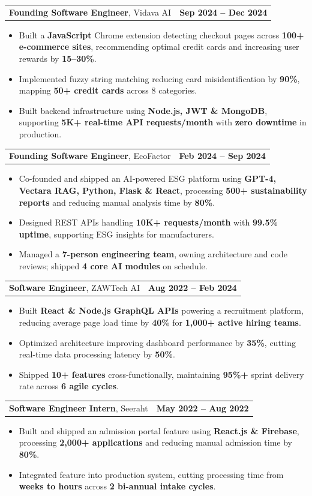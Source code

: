\documentclass[letterpaper, 11pt]{article}
\makeatletter
\newcommand{\resumeItem}[1]{\item\small{#1}}
\newcommand{\resumeSubheading}[4]{
\item
\begin{tabular*}{\textwidth}[t]{l@{\extracolsep{\fill}}r}
\textbf{#1}\textnormal{, #2} & \textbf{\small #3} \\
\end{tabular*}
}
\newcommand{\resumeItemListStart}{\begin{itemize}}
\newcommand{\resumeItemListEnd}{\end{itemize}}
\makeatother
\begin{document}
\begin{minipage}{\textwidth}
    \resumeSubheading{Founding Software Engineer}{Vidava AI}{Sep 2024 -- Dec 2024}{}
    \resumeItemListStart
        \resumeItem{Built a \textbf{JavaScript} Chrome extension detecting checkout pages across \textbf{100+ e-commerce sites}, recommending optimal credit cards and increasing user rewards by \textbf{15--30\%}.}
        \resumeItem{Implemented fuzzy string matching reducing card misidentification by \textbf{90\%}, mapping \textbf{50+ credit cards} across 8 categories.}
        \resumeItem{Built backend infrastructure using \textbf{Node.js, JWT \& MongoDB}, supporting \textbf{5K+ real-time API requests/month} with \textbf{zero downtime} in production.}
    \resumeItemListEnd

    \resumeSubheading{Founding Software Engineer}{EcoFactor}{Feb 2024 -- Sep 2024}{}
    \resumeItemListStart
        \resumeItem{Co-founded and shipped an AI-powered ESG platform using \textbf{GPT-4, Vectara RAG, Python, Flask \& React}, processing \textbf{500+ sustainability reports} and reducing manual analysis time by \textbf{80\%}.}
        \resumeItem{Designed REST APIs handling \textbf{10K+ requests/month} with \textbf{99.5\% uptime}, supporting ESG insights for manufacturers.}
        \resumeItem{Managed a \textbf{7-person engineering team}, owning architecture and code reviews; shipped \textbf{4 core AI modules} on schedule.}
    \resumeItemListEnd

    \resumeSubheading{Software Engineer}{ZAWTech AI}{Aug 2022 -- Feb 2024}{}
    \resumeItemListStart
        \resumeItem{Built \textbf{React \& Node.js GraphQL APIs} powering a recruitment platform, reducing average page load time by \textbf{40\%} for \textbf{1,000+ active hiring teams}.}
        \resumeItem{Optimized architecture improving dashboard performance by \textbf{35\%}, cutting real-time data processing latency by \textbf{50\%}.}
        \resumeItem{Shipped \textbf{10+ features} cross-functionally, maintaining \textbf{95\%+} sprint delivery rate across \textbf{6 agile cycles}.}
    \resumeItemListEnd

    \resumeSubheading{Software Engineer Intern}{Seeraht}{May 2022 -- Aug 2022}{}
    \resumeItemListStart
        \resumeItem{Built and shipped an admission portal feature using \textbf{React.js \& Firebase}, processing \textbf{2,000+ applications} and reducing manual admission time by \textbf{80\%}.}
        \resumeItem{Integrated feature into production system, cutting processing time from \textbf{weeks to hours} across \textbf{2 bi-annual intake cycles}.}
    \resumeItemListEnd


\end{minipage}
\end{document}
